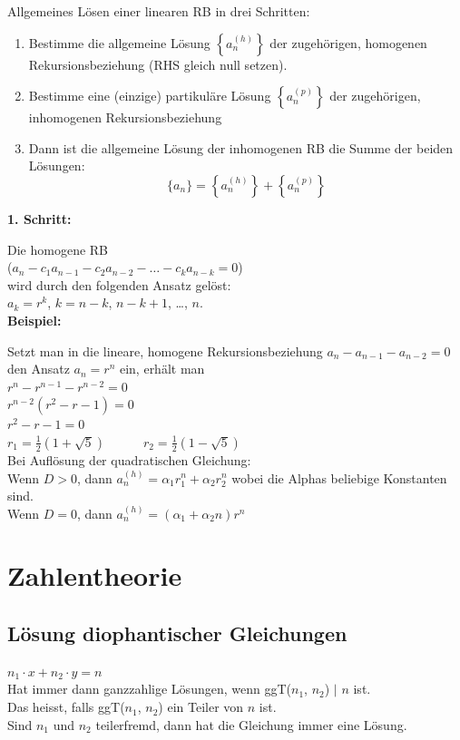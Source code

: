 \documentclass[12pt]{scrartcl}
\begin{document}
Allgemeines Lösen einer linearen RB in drei Schritten:
\begin{enumerate}
    \item Bestimme die allgemeine Lösung $\displaystyle{\left\{a_n^{(h)}\right\}}$ der zugehörigen, homogenen
    Rekursionsbeziehung (RHS gleich null setzen).
    \item Bestimme eine (einzige) partikuläre Lösung $\displaystyle{\left\{a_n^{(p)}\right\}}$ der zugehörigen, inhomogenen Rekursionsbeziehung
    \item Dann ist die allgemeine Lösung der inhomogenen RB die Summe der beiden Lösungen:
    \[\{a_n\} = \left\{a_n^{(h)}\right\} + \left\{a_n^{(p)}\right\}\]
\end{enumerate}

\textbf{1. Schritt:}

Die homogene RB\\
($a_n - c_1a_{n-1} - c_2a_{n-2} - \dots - c_ka_{n-k} = 0$)\\
wird durch den folgenden Ansatz gelöst:\\
$a_k = r^k$, $k = n-k$, $n-k + 1$, \dots, $n$.\\


\textbf{Beispiel:}

Setzt man in die lineare, homogene Rekursionsbeziehung $a_n - a_{n-1} - a_{n-2} = 0$
den Ansatz $a_n = r^n$ ein, erhält man\\

$r^n - r^{n-1} - r^{n-2} = 0$\\
$r^{n-2} (r^2 - r - 1) = 0$\\
$r^2 - r - 1 = 0$\\

$\displaystyle{r_1 = \frac{1}{2} \left(1 + \sqrt{5}\right)} \quad\quad\quad r_2 = \frac{1}{2} \left(1 - \sqrt{5}\right)$\\


Bei Auflösung der quadratischen Gleichung: \\
Wenn $D > 0$, dann $a_n^{(h)} = \alpha_1 r_1^n + \alpha_2 r_2^n$
wobei die Alphas beliebige Konstanten sind.\\

Wenn $D = 0$, dann $a_n^{(h)} = (\alpha_1 + \alpha_2 n) r^n$


\section{Zahlentheorie}
\subsection{Lösung diophantischer Gleichungen}
$n_1 \cdot x + n_2 \cdot y = n$\\
Hat immer dann ganzzahlige Lösungen, wenn ggT($n_1$, $n_2$) $\vert$ $n$ ist. \\Das heisst, 
falls ggT($n_1$, $n_2$) ein Teiler von $n$ ist.\\
Sind $n_1$ und $n_2$ teilerfremd, dann hat die Gleichung immer eine Lösung.\\
\end{document}
